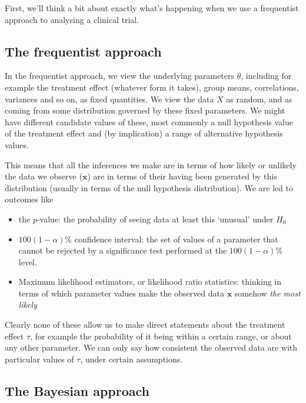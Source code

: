 \documentclass[
  openany]{book}
\providecommand{\tightlist}{%
  \setlength{\itemsep}{0pt}\setlength{\parskip}{0pt}}
\theoremstyle{definition}
\theoremstyle{definition}
\theoremstyle{definition}
\theoremstyle{definition}
\theoremstyle{remark}
\begin{document}
First, we'll think a bit about exactly what's happening when we use a frequentist approach to analysing a clinical trial.

\subsection*{The frequentist approach}\label{the-frequentist-approach}

In the frequentist approach, we view the underlying parameters \(\theta\), including for example the treatment effect (whatever form it takes), group means, correlations, variances and so on, as fixed quantities. We view the data \(X\) as random, and as coming from some distribution governed by these fixed parameters. We might have different candidate values of these, most commonly a null hypothesis value of the treatment effect and (by implication) a range of alternative hypothesis values.

This means that all the inferences we make are in terms of how likely or unlikely the data we observe (\(\mathbf{x}\)) are in terms of their having been generated by this distribution (usually in terms of the null hypothesis distribution). We are led to outcomes like

\begin{itemize}
\tightlist
\item
  the \(p\)-value: the probability of seeing data at least this `unusual' under \(H_0\)
\item
  \(100\left(1-\alpha\right)\%\) confidence interval: the set of values of a parameter that cannot be rejected by a significance test performed at the \(100\left(1-\alpha\right)\%\) level.
\item
  Maximum likelihood estimators, or likelihood ratio statistics: thinking in terms of which parameter values make the observed data \(\mathbf{x}\) somehow \emph{the most likely}
\end{itemize}

Clearly none of these allow us to make direct statements about the treatment effect \(\tau\), for example the probability of it being within a certain range, or about any other parameter. We can only say how consistent the observed data are with particular values of \(\tau\), under certain assumptions.

\subsection*{The Bayesian approach}\label{the-bayesian-approach-1}
\end{document}
